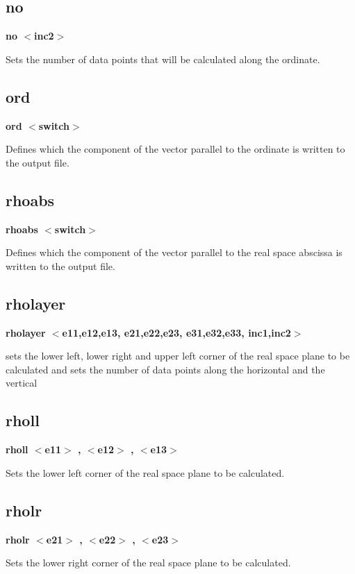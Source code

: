 \subsection*{no}
{\bf no $ <$inc2$> $ \par }
\par
\vspace{3pt}
Sets the number of data points that will be calculated along the 
ordinate. 
\subsection*{ord}
{\bf ord $ <$switch$> $ \par }
\par
\vspace{3pt}
Defines which the component of the vector parallel to the ordinate 
is written to the output file. 
\subsection*{rhoabs}
{\bf rhoabs $ <$switch$> $ \par }
\par
\vspace{3pt}
Defines which the component of the vector parallel to the 
real space abscissa is written to the output file. 
\subsection*{rholayer}
{\bf rholayer $ <$e11,e12,e13, e21,e22,e23, e31,e32,e33, inc1,inc2$> $ \par }
\par
\vspace{3pt}
sets the lower left, lower right and upper left corner of the 
real space plane to be calculated and sets the number of data 
points along the horizontal and the vertical 
\subsection*{rholl}
{\bf rholl $ <$e11$> $ , $ <$e12$> $ , $ <$e13$> $ \par }
\par
\vspace{3pt}
Sets the lower left corner of the real space plane to be calculated. 
\subsection*{rholr}
{\bf rholr $ <$e21$> $ , $ <$e22$> $ , $ <$e23$> $ \par }
\par
\vspace{3pt}
Sets the lower right corner of the real space plane to be calculated. 
